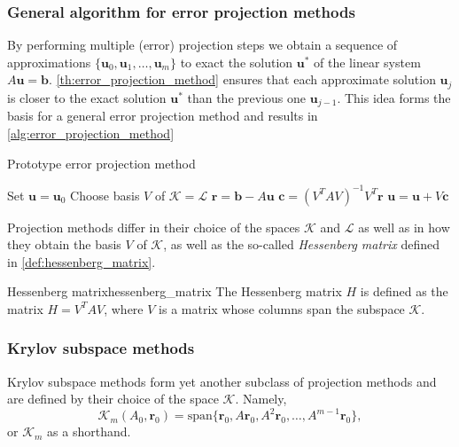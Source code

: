 \subsubsection{General algorithm for error projection methods}
By performing multiple (error) projection steps we obtain a sequence of approximations $\{\mathbf{u}_0, \mathbf{u}_1, \dots, \mathbf{u}_m\}$ to exact the solution $\mathbf{u}^*$ of the linear system $A\mathbf{u} = \mathbf{b}$. \cref{th:error_projection_method} ensures that each approximate solution $\mathbf{u}_j$ is closer to the exact solution $\mathbf{u}^*$ than the previous one $\mathbf{u}_{j-1}$. This idea forms the basis for a general error projection method and results in \cref{alg:error_projection_method}
\begin{algorithm}[H]
  \caption{Prototype error projection method \cite[Algorithm 5.1]{iter_method_saad}}
  \begin{algorithmic}
    \State Set $\mathbf{u} = \mathbf{u}_0$
    \State Choose basis $V$ of $\mathcal{K}=\mathcal{L}$
    \State $\mathbf{r} = \mathbf{b} - A \mathbf{u}$
    \State $\mathbf{c} = (V^TAV)^{-1}V^T\mathbf{r}$
    \State $\mathbf{u} = \mathbf{u} + V\mathbf{c}$
    \EndWhile
  \end{algorithmic}
  \label{alg:error_projection_method}
\end{algorithm}
Projection methods differ in their choice of the spaces $\mathcal{K}$ and $\mathcal{L}$ as well as in how they obtain the basis $V$ of $\mathcal{K}$, as well as the so-called \textit{Hessenberg matrix} defined in \cref{def:hessenberg_matrix}.
\begin{fancydef}{Hessenberg matrix}{hessenberg_matrix}
  The Hessenberg matrix $H$ is defined as the matrix $H = V^TAV$, where $V$ is a matrix whose columns span the subspace $\mathcal{K}$.
\end{fancydef}

\subsubsection{Krylov subspace methods}
Krylov subspace methods form yet another subclass of projection methods and are defined by their choice of the space $\mathcal{K}$. Namely,
\begin{equation}
  \mathcal{K}_m(A_0, \mathbf{r}_0) = \text{span}\{\mathbf{r}_0, A\mathbf{r}_0, A^2\mathbf{r}_0, \dots, A^{m-1}\mathbf{r}_0\},
  \label{eq:cg_krylov_space}
\end{equation}
or $\mathcal{K}_m$ as a shorthand.

